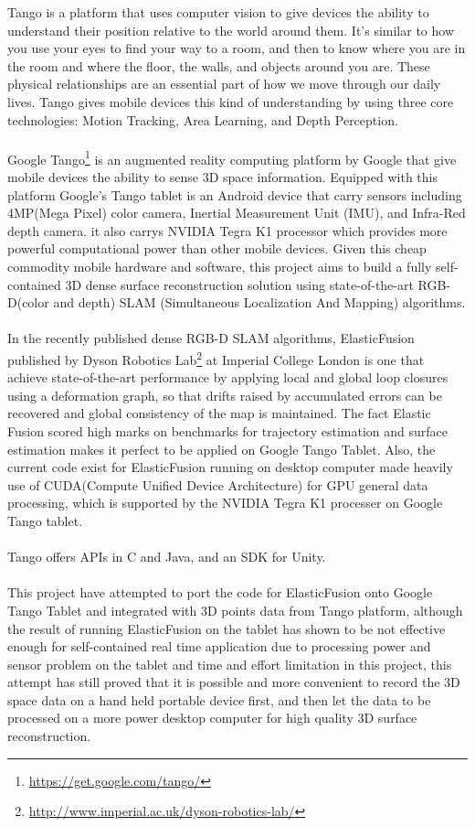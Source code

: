 \documentclass[12pt,twoside]{article}
\begin{document}
Tango is a platform that uses computer vision to give devices the ability to understand their position relative to the world around them. It’s similar to how you use your eyes to find your way to a room, and then to know where you are in the room and where the floor, the walls, and objects around you are. These physical relationships are an essential part of how we move through our daily lives. Tango gives mobile devices this kind of understanding by using three core technologies: Motion Tracking, Area Learning, and Depth Perception.\\
\\
Google Tango\footnote{\url{https://get.google.com/tango/}} is an augmented reality computing platform by Google that give mobile devices the ability to sense 3D space information. Equipped with this platform Google's Tango tablet is an Android device that carry sensors including 4MP(Mega Pixel) color camera, Inertial Measurement Unit (IMU), and Infra-Red depth camera. it also carrys NVIDIA Tegra K1 processor which provides more powerful computational power than other mobile devices. Given this cheap commodity mobile hardware and software, this project aims to build a fully self-contained 3D dense surface reconstruction solution using  state-of-the-art RGB-D(color and depth) SLAM (Simultaneous Localization And Mapping) algorithms.\\
\\
In the recently published dense RGB-D SLAM algorithms, ElasticFusion\cite{whelan2016elasticfusion} published by Dyson Robotics Lab\footnote{\url{http://www.imperial.ac.uk/dyson-robotics-lab/}} at Imperial College London is one that achieve state-of-the-art performance by applying local and global loop closures using a deformation graph, so that drifts raised by accumulated errors can be recovered and global consistency of the map is maintained. The fact Elastic Fusion scored high marks on benchmarks for trajectory estimation and surface estimation makes it perfect to be applied on Google Tango Tablet. Also, the current code exist for ElasticFusion running on desktop computer made heavily use of CUDA(Compute Unified Device Architecture) for GPU general data processing, which is supported by the NVIDIA Tegra K1 processer on Google Tango tablet.\\
\\
Tango offers APIs in C and Java, and an SDK for Unity. \\
\\
This project have attempted to port the code for ElasticFusion onto Google Tango Tablet and integrated with 3D points data from Tango platform, although the result of running ElasticFusion on the tablet has shown to be not effective enough for self-contained real time application due to processing power and sensor problem on the tablet and time and effort limitation in this project, this attempt has still proved that it is possible and more convenient to record the 3D space data on a hand held portable device first, and then let the data to be processed on a more power desktop computer for high quality 3D surface reconstruction.\\
\end{document}
